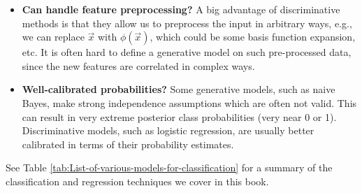 \begin{itemize}
\item{\textbf{Can handle feature preprocessing?} A big advantage of discriminative methods is that they allow us to preprocess the input in arbitrary ways, e.g., we can replace $\vec{x}$ with $\phi(\vec{x})$, which could be some basis function expansion, etc. It is often hard to define a generative model on such pre-processed data, since the new features are correlated in complex ways.}

\item{\textbf{Well-calibrated probabilities?} Some generative models, such as naive Bayes, make strong independence assumptions which are often not valid. This can result in very extreme posterior class probabilities (very near 0 or 1). Discriminative models, such as logistic regression, are usually better calibrated in terms of their probability estimates.}
\end{itemize}

See Table \ref{tab:List-of-various-models-for-classification} for a summary of the classification and regression techniques we cover in this book.

